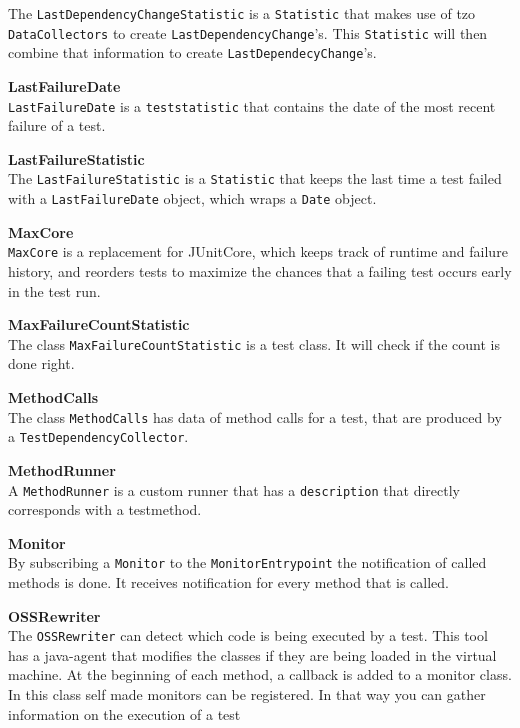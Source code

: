 \documentclass[i2]{oss}
\newcommand{\class}[1]{\texttt{#1}}
\newcommand{\gloss}[1]{\textbf{#1}}
\begin{document}
\begin{description}
The \class{LastDependencyChangeStatistic} is a \class{Statistic} that makes use of tzo \class{DataCollectors} to create \class{LastDependencyChange}'s. This \class{Statistic} will then combine that information to create \class{LastDependecyChange}'s.

\item \gloss{LastFailureDate} \\
\class{LastFailureDate} is a \class{teststatistic} that contains the date of the most recent failure of a test.

\item \gloss{LastFailureStatistic}\\
 The \class{LastFailureStatistic} is a \class{Statistic} that keeps the last time a test failed with a \class{LastFailureDate} object, which wraps a \class{Date} object.

\item \gloss{MaxCore} \\
\class{MaxCore} is a replacement for JUnitCore, which keeps track of runtime and failure history, and reorders tests to maximize the chances that a failing test occurs early in the test run.

\item \gloss{MaxFailureCountStatistic} \\
The class \class{MaxFailureCountStatistic} is a test class. It will check if the count is done right.

\item \gloss{MethodCalls} \\
The class \class{MethodCalls} has data of method calls for a test, that are produced by a \class{TestDependencyCollector}.

\item \gloss{MethodRunner}\\
A \class{MethodRunner} is a custom runner that has a \class{description} that directly corresponds with a testmethod.

\item \gloss{Monitor} \\
By subscribing a \class{Monitor} to the \class{MonitorEntrypoint} the notification of called methods is done. It receives notification for every method that is called.

\item \gloss{OSSRewriter}\\
The \class{OSSRewriter} can detect which code is being executed by a test. This tool has a java-agent that modifies the classes if they are being loaded in the virtual machine. At the beginning of each method, a callback is added to a monitor
class. In this class self made monitors can be registered. In that way you
can gather information on the execution of a test 


\end{description}
\end{document}
